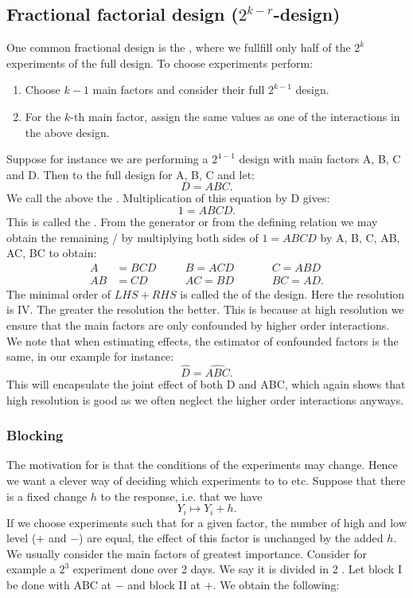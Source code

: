 \subsection{Fractional factorial design ($2^{k-r}$-design)}

One common fractional design is the , where we fullfill only half of the $2^k$ experiments of the full design. To choose experiments perform:
\begin{enumerate}
    \item Choose $k-1$ main factors and consider their full $2^{k-1}$ design.
    \item For the $k$-th main factor, assign the same values as one of the interactions in the above design. 
\end{enumerate}
Suppose for instance we are performing a $2^{4-1}$ design with main factors A, B, C and D. Then to the full design for A, B, C and let:
$$
    D = ABC.
$$
We call the above the . Multiplication of this equation by D gives:
$$
    1 = ABCD.
$$
This is called the . From the generator or from the defining relation we may obtain the remaining  /  by multiplying both sides of $1=ABCD$ by A, B, C, AB, AC, BC to obtain:
\begin{align*}
        A &= BCD \quad &&B = ACD \quad &&&C = ABD \\
        AB &= CD \quad &&AC = BD \quad &&&BC = AD.
\end{align*}
The minimal order of $LHS+RHS$ is called the  of the design. Here the resolution is IV. The greater the resolution the better. This is because at high resolution we ensure that the main factors are only confounded by higher order interactions. We note that when estimating effects, the estimator of confounded factors is the same, in our example for instance:
$$
    \hat{D} = \hat{ABC}.
$$
This will encapsulate the joint effect of both D and ABC, which again shows that high resolution is good as we often neglect the higher order interactions anyways. 

\subsubsection{Blocking}

The motivation for  is that the conditions of the experiments may change. Hence we want a clever way of deciding which experiments to to  etc. Suppose that there is a fixed change $h$ to the response, i.e. that  we have
$$
    Y_i \mapsto Y_i + h.
$$
If we choose experiments such that for a given factor, the number of high and low level ($+$ and $-$) are equal, the effect of this factor is unchanged by the added $h$. We usually consider the main factors of greatest importance. Consider for example a $2^3$ experiment done over 2 days. We say it is divided in 2 . Let block I be done with ABC at $-$ and block II at $+$. We obtain the following:

